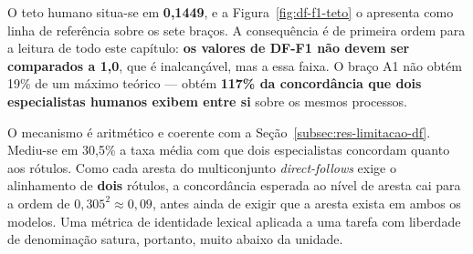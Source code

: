 \begin{table}[h!]
\end{table}



O teto humano situa-se em \textbf{0,1449}, e a Figura~\ref{fig:df-f1-teto} o apresenta como linha de referência sobre os sete braços. A consequência é de primeira ordem para a leitura de todo este capítulo: \textbf{os valores de DF-F1 não devem ser comparados a 1,0}, que é inalcançável, mas a essa faixa. O braço A1 não obtém 19\% de um máximo teórico --- obtém \textbf{117\% da concordância que dois especialistas humanos exibem entre si} sobre os mesmos processos.

O mecanismo é aritmético e coerente com a Seção~\ref{subsec:res-limitacao-df}. Mediu-se em 30,5\% a taxa média com que dois especialistas concordam quanto aos rótulos. Como cada aresta do multiconjunto \textit{direct-follows} exige o alinhamento de \textbf{dois} rótulos, a concordância esperada ao nível de aresta cai para a ordem de $0{,}305^2 \approx 0{,}09$, antes ainda de exigir que a aresta exista em ambos os modelos. Uma métrica de identidade lexical aplicada a uma tarefa com liberdade de denominação satura, portanto, muito abaixo da unidade.

